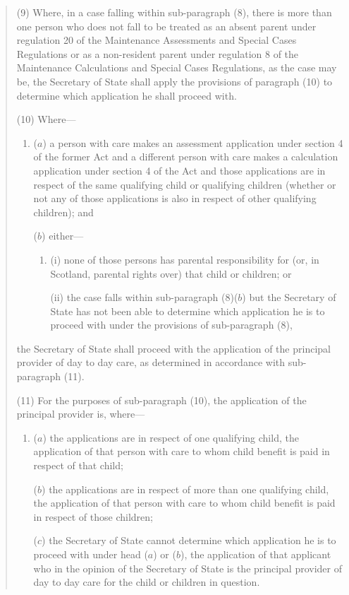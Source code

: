 \documentclass[12pt,a4paper]{article}
\begin{document}
\begin{quotation}
(9) Where, in a case falling within sub-paragraph (8), there is more than one person who does not fall to be treated as an absent parent under regulation 20 of the Maintenance Assessments and Special Cases Regulations or as a non-resident parent under regulation 8 of the Maintenance Calculations and Special Cases Regulations, as the case may be, the Secretary of State shall apply the provisions of paragraph (10) to determine which application he shall proceed with.

(10) Where—
\begin{enumerate}\item[]
($a$) a person with care makes an assessment application under section 4 of the former Act and a different person with care makes a calculation application under section 4 of the Act and those applications are in respect of the same qualifying child or qualifying children (whether or not any of those applications is also in respect of other qualifying children); and

($b$) either—
\begin{enumerate}\item[]
(i) none of those persons has parental responsibility for (or, in Scotland, parental rights over) that child or children; or

(ii) the case falls within sub-paragraph (8)($b$)  but the Secretary of State has not been able to determine which application he is to proceed with under the provisions of sub-paragraph (8),
\end{enumerate}
\end{enumerate}
the Secretary of State shall proceed with the application of the principal provider of day to day care, as determined in accordance with sub-paragraph (11).

(11) For the purposes of sub-paragraph (10), the application of the principal provider is, where—
\begin{enumerate}\item[]
($a$) the applications are in respect of one qualifying child, the application of that person with care to whom child benefit is paid in respect of that child;

($b$) the applications are in respect of more than one qualifying child, the application of that person with care to whom child benefit is paid in respect of those children;

($c$) the Secretary of State cannot determine which application he is to proceed with under head ($a$)  or ($b$), the application of that applicant who in the opinion of the Secretary of State is the principal provider of day to day care for the child or children in question.
\end{enumerate}


\end{quotation}
\end{document}
